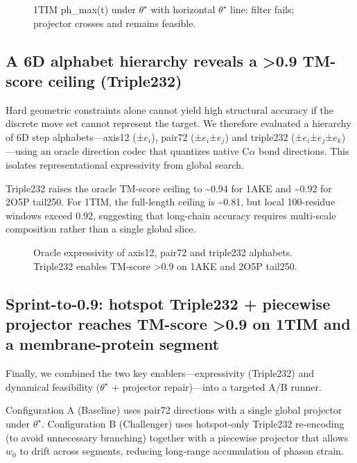 \begin{figure}[t]
  \centering
  \caption{1TIM ph\_max(t) under $\theta^\star$ with horizontal $\theta^\star$ line: filter fails; projector crosses and remains feasible.}
  \label{fig:7}
\end{figure}

\subsection{A 6D alphabet hierarchy reveals a >0.9 TM-score ceiling (Triple232)}

Hard geometric constraints alone cannot yield high structural accuracy if the discrete move set cannot represent the target. We therefore evaluated a hierarchy of 6D step alphabets—axis12 (±$e_i$), pair72 (±$e_i$±$e_j$) and triple232 (±$e_i$±$e_j$±$e_k$)—using an oracle direction codec that quantizes native C$\alpha$ bond directions. This isolates representational expressivity from global search.

Triple232 raises the oracle TM-score ceiling to \textasciitilde{}0.94 for 1AKE and \textasciitilde{}0.92 for 2O5P tail250. For 1TIM, the full-length ceiling is \textasciitilde{}0.81, but local 100-residue windows exceed 0.92, suggesting that long-chain accuracy requires multi-scale composition rather than a single global slice.

\begin{figure}[t]
  \centering
  \caption{Oracle expressivity of axis12, pair72 and triple232 alphabets. Triple232 enables TM-score >0.9 on 1AKE and 2O5P tail250.}
  \label{fig:8}
\end{figure}

\subsection{Sprint-to-0.9: hotspot Triple232 + piecewise projector reaches TM-score >0.9 on 1TIM and a membrane-protein segment}

Finally, we combined the two key enablers—expressivity (Triple232) and dynamical feasibility ($\theta^\star$ + projector repair)—into a targeted A/B runner.

Configuration A (Baseline) uses pair72 directions with a single global projector under $\theta^\star$. Configuration B (Challenger) uses hotspot-only Triple232 re-encoding (to avoid unnecessary branching) together with a piecewise projector that allows $w_0$ to drift across segments, reducing long-range accumulation of phason strain.

